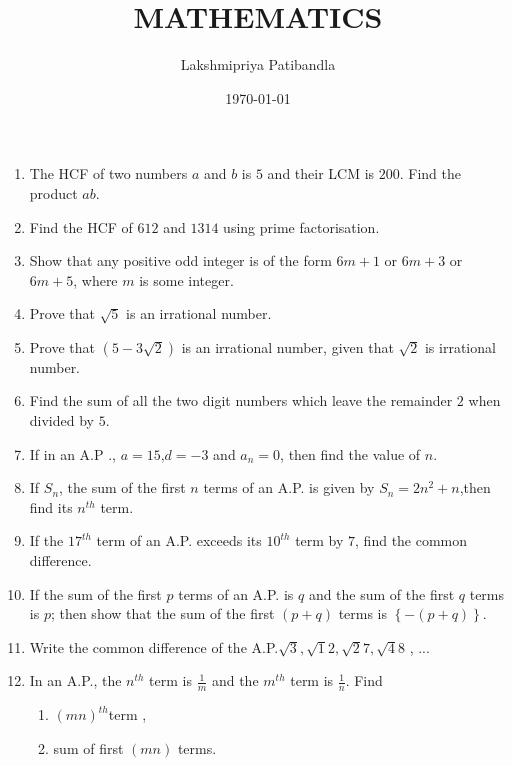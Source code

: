 \documentclass[2pt,-letter paper]{article}
\title{MATHEMATICS}
\author{Lakshmipriya Patibandla}
\date{\today}
\providecommand{\cbrak}[1]{\ensuremath{\left\{#1\right\}}}
\providecommand{\brak}[1]{\ensuremath{\left(#1\right)}}
\begin{document}
\maketitle
\begin{enumerate}
\section{Discrete}

\item The HCF of two numbers $a$ and $b$ is $5$ and their LCM is $200 $. Find the product $ab$.

\item Find the HCF of $612$ and $1314$ using prime factorisation.

\item Show that any positive odd integer is of the form $6m + 1$ or $6m + 3$ or $6m + 5$, where $m$ is some integer.

\item Prove that ${\sqrt 5}$ is an irrational number.

\item Prove that $\brak{5 - 3{\sqrt 2}}$ is an irrational number, given that ${\sqrt2}$ is irrational number.

\item Find the sum of all the two digit numbers which leave the remainder $2$ when divided by $5$.

\item If in an A.P ., $a=15$,$d=-3$ and $a_n=0$, then find the value of $n$.

\item If ${S_n}$, the sum of the first ${n}$ terms of an A.P. is given by ${S_n = 2n^2 + n}$,then find its $n^{th}$ term. 

\item If the $17^{th}$ term of an A.P. exceeds its $10^{th}$ term by $7$, find the common difference.

\item If the sum of the first $p$ terms of an A.P. is $q$ and the sum of the first $q$ terms is $p$; then show that the sum of the first $\brak{p + q}$ terms is $\cbrak {-\brak {p + q}}$.

\item Write the common difference of the A.P.${\sqrt3} , {\sqrt12} , {\sqrt27} , {\sqrt48}$ , ... 

\item In an A.P., the $n^{th}$ term is ${\frac{1}{m}}$ and the $m^{th}$ term is $\frac{1}{n}$. Find \begin{enumerate}
     \item  $\brak{mn}^{th}$term  ,
     \item sum of first $\brak{mn}$ terms.
\end{enumerate}


\end{enumerate}
\end{document}
